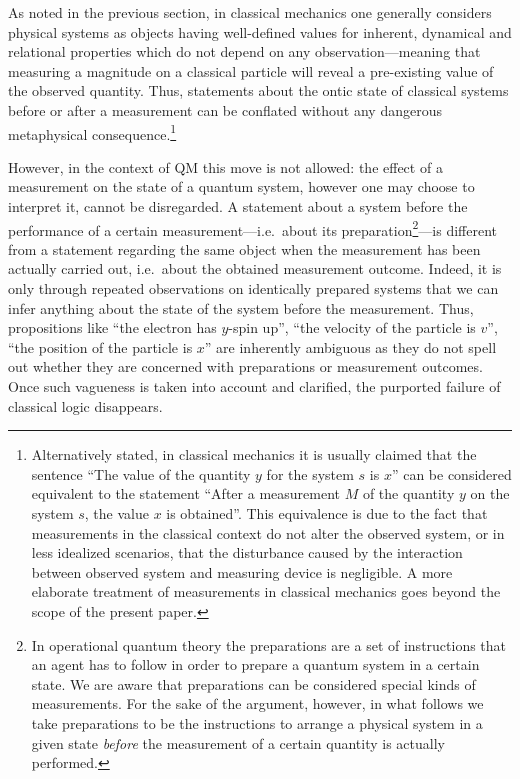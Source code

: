 \documentclass[11pt, executivepaper]{article}
\begin{document}
As noted in the previous section, in classical mechanics one generally considers physical systems as objects having well-defined values for inherent, dynamical and relational properties which do not depend on any observation---meaning that measuring a magnitude on a classical particle will reveal a pre-existing value of the observed quantity. Thus, statements about the ontic state of classical systems before or after a measurement can be conflated without any dangerous metaphysical consequence.\footnote{Alternatively stated, in classical mechanics it is usually claimed that the sentence ``The value of the quantity $y$ for the system $s$ is $x$'' can be considered equivalent to the statement ``After a measurement $M$ of the quantity $y$ on the system $s$, the value $x$ is obtained''. This equivalence is due to the fact that measurements in the classical context do not alter the observed system, or in less idealized scenarios, that the disturbance caused by the interaction between observed system and measuring device is negligible. A more elaborate treatment of measurements in classical mechanics goes beyond the scope of the present paper.}

However, in the context of QM this move is not allowed: the effect of a measurement on the state of a quantum system, however one may choose to interpret it, cannot be disregarded. A statement about a system before the performance of a certain measurement---i.e.\ about its preparation\footnote{In operational quantum theory the preparations are a set of instructions that an agent has to follow in order to prepare a quantum system in a certain state. We are aware that preparations can be considered special kinds of measurements. For the sake of the argument, however, in what follows we take preparations to be the instructions to arrange a physical system in a given state \emph{before} the measurement of a certain quantity is actually performed.}---is different from a statement regarding the same object when the measurement has been actually carried out, i.e.\ about the obtained measurement outcome. Indeed, it is only through repeated observations on identically prepared systems that we can infer anything about the state of the system before the measurement. Thus, propositions like ``the electron has $y$-spin up'', ``the velocity of the particle is $v$'', ``the position of the particle is $x$'' are inherently ambiguous as they do not spell out whether they are concerned with preparations or measurement outcomes. Once such vagueness is taken into account and clarified, the purported failure of classical logic disappears.
\end{document}
